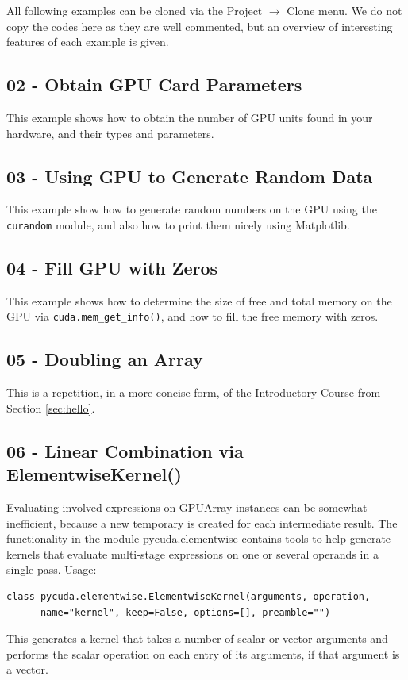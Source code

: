 \documentclass[article,A4,12pt]{llncs}
\begin{document}
All following examples can be cloned via the Project $\rightarrow$ Clone menu.
We do not copy the codes here as they are well commented, but an overview of 
interesting features of each example is given.

\subsection{02 - Obtain GPU Card Parameters}

This example shows how to obtain the number of GPU units found in your hardware, and 
their types and parameters. 

\subsection{03 - Using GPU to Generate Random Data}

This example show how to generate random numbers on the GPU using the {\tt curandom}
module, and also how to print them nicely using Matplotlib.

\subsection{04 - Fill GPU with Zeros}

This example shows how to determine the size of free and total 
memory on the GPU via {\tt cuda.mem\_get\_info()}, and how to fill 
the free memory with zeros.

\subsection{05 - Doubling an Array}

This is a repetition, in a more concise form, of the Introductory Course
from Section \ref{sec:hello}.

\subsection{06 - Linear Combination via ElementwiseKernel()}

Evaluating involved expressions on GPUArray instances can be somewhat inefficient, because a new temporary is created for each intermediate result. The functionality in the module pycuda.elementwise contains tools to help generate kernels that evaluate multi-stage expressions on one or several operands in a single pass. Usage:

\begin{verbatim}
class pycuda.elementwise.ElementwiseKernel(arguments, operation, 
      name="kernel", keep=False, options=[], preamble="")
\end{verbatim}
This generates a kernel that takes a number of scalar or vector arguments and performs the scalar operation on each entry of its arguments, if that argument is a vector.
\end{document}

